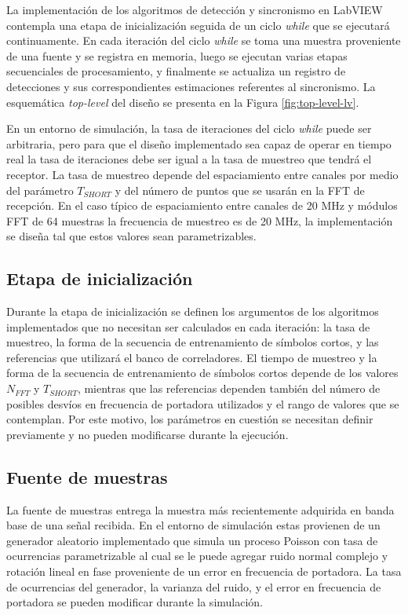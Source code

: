 La implementación de los algoritmos de detección y sincronismo en LabVIEW contempla una etapa de inicialización seguida de un ciclo \textit{while} que se ejecutará continuamente. En cada iteración del ciclo \textit{while} se toma una muestra proveniente de una fuente y se registra en memoria, luego se ejecutan varias etapas secuenciales de procesamiento, y finalmente se actualiza un registro de detecciones y sus correspondientes estimaciones referentes al sincronismo. La esquemática \textit{top-level} del diseño se presenta en la Figura \ref{fig:top-level-lv}.

En un entorno de simulación, la tasa de iteraciones del ciclo \textit{while} puede ser arbitraria, pero para que el diseño implementado sea capaz de operar en tiempo real la tasa de iteraciones debe ser igual a la tasa de muestreo que tendrá el receptor. La tasa de muestreo depende del espaciamiento entre canales por medio del parámetro $T_{SHORT}$ y del número de puntos que se usarán en la FFT de recepción. En el caso típico de espaciamiento entre canales de 20 MHz y módulos FFT de 64 muestras la frecuencia de muestreo es de 20 MHz, la implementación se diseña tal que estos valores sean parametrizables.

\subsection{Etapa de inicialización}

Durante la etapa de inicialización se definen los argumentos de los algoritmos implementados que no necesitan ser calculados en cada iteración: la tasa de muestreo, la forma de la secuencia de entrenamiento de símbolos cortos, y las referencias que utilizará el banco de correladores. El tiempo de muestreo y la forma de la secuencia de entrenamiento de símbolos cortos depende de los valores $N_{FFT}$ y $T_{SHORT}$, mientras que las referencias dependen también del número de posibles desvíos en frecuencia de portadora utilizados y el rango de valores que se contemplan. Por este motivo, los parámetros en cuestión se necesitan definir previamente y no pueden modificarse durante la ejecución. 

\subsection{Fuente de muestras}

La fuente de muestras entrega la muestra más recientemente adquirida en banda base de una señal recibida. En el entorno de simulación estas provienen de un generador aleatorio implementado que simula un proceso Poisson con tasa de ocurrencias parametrizable al cual se le puede agregar ruido normal complejo y rotación lineal en fase proveniente de un error en frecuencia de portadora. La tasa de ocurrencias del generador, la varianza del ruido, y el error en frecuencia de portadora se pueden modificar durante la simulación.


